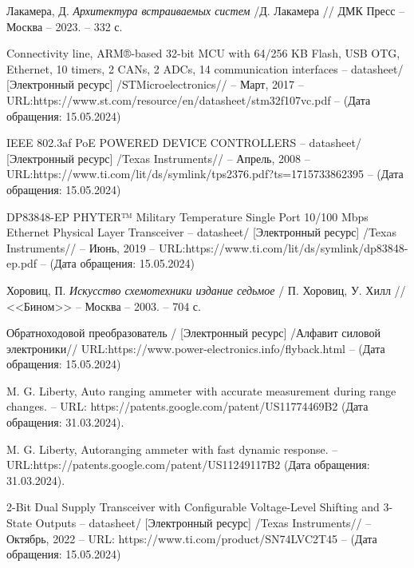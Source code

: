 \begin{thebibliography}{00}


 Лакамера, Д.
\emph{Архитектура встраиваемых систем} /Д. Лакамера // ДМК Пресс --
Москва -- 2023. -- 332 с.

 Connectivity line, ARM®-based 32-bit MCU with 64/256 KB Flash,
 USB OTG, Ethernet, 10 timers, 2 CANs, 2 ADCs, 14 communication interfaces -- datasheet/
  [Электронный ресурс]
 /STMicroelectronics// -- Март, 2017 -- 
 URL:https://www.st.com/resource/en/datasheet/stm32f107vc.pdf --
 (Дата обращения: 15.05.2024)

 IEEE 802.3af PoE POWERED DEVICE CONTROLLERS -- datasheet/
  [Электронный ресурс] /Texas Instruments// -- Апрель, 2008 
  -- URL:https://www.ti.com/lit/ds/symlink/tps2376.pdf?ts=1715733862395 --
  (Дата обращения: 15.05.2024)

 DP83848-EP PHYTER™ Military Temperature Single Port
   10/100 Mbps Ethernet
  Physical Layer Transceiver -- datasheet/
  [Электронный ресурс] /Texas Instruments// -- Июнь, 2019 
  -- URL:https://www.ti.com/lit/ds/symlink/dp83848-ep.pdf --
  (Дата обращения: 15.05.2024)

 Хоровиц, П.
\emph{Искусство схемотехники издание седьмое} / П. Хоровиц, У. Хилл // <<Бином>> --
Москва -- 2003. -- 704 с.

 Обратноходовой преобразователь /
  [Электронный ресурс] /Алфавит силовой электроники// 
   URL:https://www.power-electronics.info/flyback.html --
  (Дата обращения: 15.05.2024)

 M. G. Liberty, Auto ranging ammeter with accurate measurement 
during range changes. -- URL:
https://patents.google.com/patent/US11774469B2 (Дата обращения: 31.03.2024).

 M. G. Liberty, Autoranging ammeter with fast dynamic response.
-- URL:https://patents.google.com/patent/US11249117B2 (Дата обращения: 31.03.2024).


 2-Bit Dual Supply Transceiver with Configurable 
Voltage-Level Shifting and 3-State Outputs
 -- datasheet/
  [Электронный ресурс] /Texas Instruments// -- Октябрь, 2022 -- 
  URL: https://www.ti.com/product/SN74LVC2T45
   -- (Дата обращения: 15.05.2024)


\end{thebibliography}
